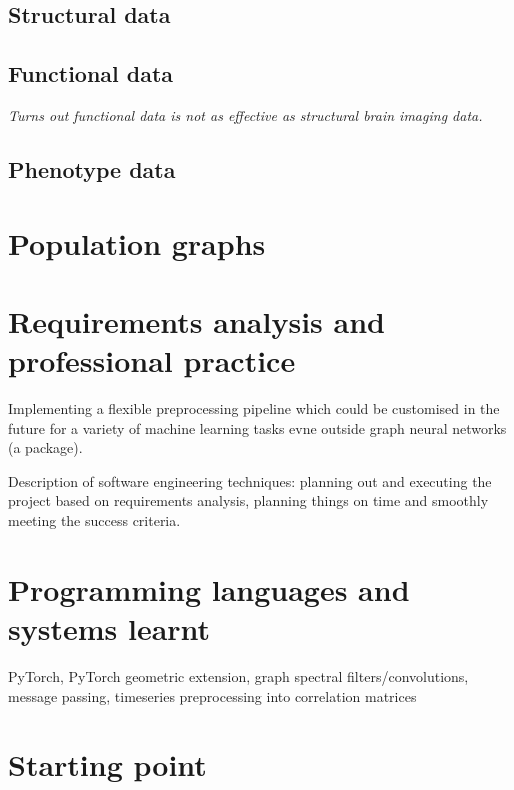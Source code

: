 \documentclass[12pt,a4paper,twoside, openright, hidelinks]{report}
\begin{document}
\subsection{Structural data}

\subsection{Functional data}
\textit{Turns out functional data is not as effective as structural brain imaging data.}

\subsection{Phenotype data}

\section{Population graphs}

\section{Requirements analysis and professional practice}

Implementing a flexible preprocessing pipeline which could be customised in the future for a variety of machine learning tasks evne outside graph neural networks (a package).

Description of software engineering techniques: planning out and executing the project based on requirements analysis, planning things on time and smoothly meeting the success criteria.

\section{Programming languages and systems learnt}
PyTorch, PyTorch geometric extension, graph spectral filters/convolutions, message passing, timeseries preprocessing into correlation matrices

\section{Starting point}
\end{document}
